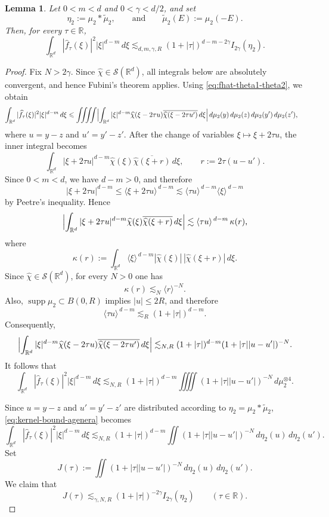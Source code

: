 \documentclass[11pt]{amsart}
\numberwithin{equation}{section}
\renewcommand{\le}{\leqslant}
\newtheorem{lemma}[theorem]{Lemma}
\newcommand{\spt}{\operatorname{supp}}
\theoremstyle{plain}
\theoremstyle{remark}
\newcommand{\R}{\mathbb{R}}
\newcommand{\Rd}{\mathbb{R}^d}
\newcommand{\ang}[1]{\langle #1\rangle}
\begin{document}
\begin{lemma}\label{lem:agenera}
Let $0<m<d$ and $0<\gamma<d/2$, and set
\[
\eta_2:=\mu_2*\widetilde\mu_2,
\qquad \text{and} \qquad 
\widetilde\mu_2(E):=\mu_2(-E).
\]
Then, for every $\tau\in\R$,
\begin{equation}\label{eq:L2-weighted-general}
\int_{\Rd}|\widehat f_{\tau}(\xi)|^2|\xi|^{d-m}\,d\xi
\lesssim_{d,m,\gamma,R}
(1+|\tau|)^{d-m-2\gamma}I_{2\gamma}(\eta_2).
\end{equation}
\end{lemma}
\begin{proof}
Fix $N>2\gamma$. Since $\widehat\chi\in\mathcal S(\Rd)$, all integrals below are
absolutely convergent, and hence Fubini's theorem applies. Using
\eqref{eq:fhat-theta1-theta2}, we obtain
\begin{align*}
\int_{\Rd}|\widehat f_{\tau}(\xi)|^2|\xi|^{d-m}\,d\xi
&\le
\iiiint
\Bigl|
\int_{\Rd}
|\xi|^{d-m}\widehat\chi(\xi-2\tau u)
\overline{\widehat\chi(\xi-2\tau u')}
\,d\xi
\Bigr|
\,d\mu_2(y)\,d\mu_2(z)\,d\mu_2(y')\,d\mu_2(z'),
\end{align*}
where $u=y-z$ and $u'=y'-z'$. After the change of variables
$\xi\mapsto \xi+2\tau u$, the inner integral becomes
\[
\int_{\Rd} |\xi+2\tau u|^{d-m}\widehat\chi(\xi)
\overline{\widehat\chi(\xi+r)}\,d\xi,
\qquad r:=2\tau(u-u').
\]
Since $0<m<d$, we have $d-m>0$, and therefore
\[
|\xi+2\tau u|^{d-m}
\le
\ang{\xi+2\tau u}^{\,d-m}
\lesssim
\ang{\tau u}^{\,d-m}\ang{\xi}^{\,d-m}
\]
by Peetre's inequality. Hence
\[
\Bigl|
\int_{\Rd} |\xi+2\tau u|^{d-m}\widehat\chi(\xi)
\overline{\widehat\chi(\xi+r)}\,d\xi
\Bigr|
\lesssim
\ang{\tau u}^{\,d-m}\,\kappa(r),
\]
where
\[
\kappa(r):=
\int_{\Rd}\ang{\xi}^{\,d-m}|\widehat\chi(\xi)|\,|\widehat\chi(\xi+r)|\,d\xi.
\]
Since $\widehat\chi\in\mathcal S(\Rd)$, for every $N>0$ one has
\[
\kappa(r)\lesssim_N \ang{r}^{-N}.
\]
Also, $\spt\mu_2\subset B(0,R)$ implies $|u|\le 2R$, and therefore
\[
\ang{\tau u}^{\,d-m}\lesssim_R (1+|\tau|)^{d-m}.
\]
Consequently,
\[
\Bigl|
\int_{\Rd}
|\xi|^{d-m}\widehat\chi(\xi-2\tau u)
\overline{\widehat\chi(\xi-2\tau u')}\,d\xi
\Bigr|
\lesssim_{N,R}
(1+|\tau|)^{d-m}(1+|\tau||u-u'|)^{-N}.
\]
It follows that
\begin{equation}\label{eq:kernel-bound-agenera}
\int_{\Rd}|\widehat f_{\tau}(\xi)|^2|\xi|^{d-m}\,d\xi
\lesssim_{N,R}
(1+|\tau|)^{d-m}
\iiiint (1+|\tau||u-u'|)^{-N}\,d\mu_2^{\otimes 4}.
\end{equation}

Since $u=y-z$ and $u'=y'-z'$ are distributed according to
$\eta_2=\mu_2*\widetilde\mu_2$, \eqref{eq:kernel-bound-agenera} becomes
\[
\int_{\Rd}|\widehat f_{\tau}(\xi)|^2|\xi|^{d-m}\,d\xi
\lesssim_{N,R}
(1+|\tau|)^{d-m}
\iint (1+|\tau||u-u'|)^{-N}\,d\eta_2(u)\,d\eta_2(u').
\]
Set
\[
J(\tau):=
\iint (1+|\tau||u-u'|)^{-N}\,d\eta_2(u)\,d\eta_2(u').
\]
We claim that
\begin{equation}\label{eq:kernel-to-energy-agenera}
J(\tau)\lesssim_{\gamma,N,R}(1+|\tau|)^{-2\gamma}I_{2\gamma}(\eta_2)
\qquad (\tau\in\R).
\end{equation}


\end{proof}
\end{document}
